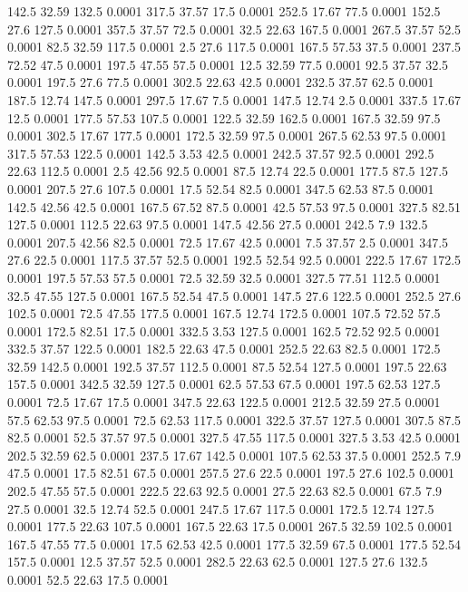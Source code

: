 142.5	32.59	132.5	0.0001
317.5	37.57	17.5	0.0001
252.5	17.67	77.5	0.0001
152.5	27.6	127.5	0.0001
357.5	37.57	72.5	0.0001
32.5	22.63	167.5	0.0001
267.5	37.57	52.5	0.0001
82.5	32.59	117.5	0.0001
2.5	27.6	117.5	0.0001
167.5	57.53	37.5	0.0001
237.5	72.52	47.5	0.0001
197.5	47.55	57.5	0.0001
12.5	32.59	77.5	0.0001
92.5	37.57	32.5	0.0001
197.5	27.6	77.5	0.0001
302.5	22.63	42.5	0.0001
232.5	37.57	62.5	0.0001
187.5	12.74	147.5	0.0001
297.5	17.67	7.5	0.0001
147.5	12.74	2.5	0.0001
337.5	17.67	12.5	0.0001
177.5	57.53	107.5	0.0001
122.5	32.59	162.5	0.0001
167.5	32.59	97.5	0.0001
302.5	17.67	177.5	0.0001
172.5	32.59	97.5	0.0001
267.5	62.53	97.5	0.0001
317.5	57.53	122.5	0.0001
142.5	3.53	42.5	0.0001
242.5	37.57	92.5	0.0001
292.5	22.63	112.5	0.0001
2.5	42.56	92.5	0.0001
87.5	12.74	22.5	0.0001
177.5	87.5	127.5	0.0001
207.5	27.6	107.5	0.0001
17.5	52.54	82.5	0.0001
347.5	62.53	87.5	0.0001
142.5	42.56	42.5	0.0001
167.5	67.52	87.5	0.0001
42.5	57.53	97.5	0.0001
327.5	82.51	127.5	0.0001
112.5	22.63	97.5	0.0001
147.5	42.56	27.5	0.0001
242.5	7.9	132.5	0.0001
207.5	42.56	82.5	0.0001
72.5	17.67	42.5	0.0001
7.5	37.57	2.5	0.0001
347.5	27.6	22.5	0.0001
117.5	37.57	52.5	0.0001
192.5	52.54	92.5	0.0001
222.5	17.67	172.5	0.0001
197.5	57.53	57.5	0.0001
72.5	32.59	32.5	0.0001
327.5	77.51	112.5	0.0001
32.5	47.55	127.5	0.0001
167.5	52.54	47.5	0.0001
147.5	27.6	122.5	0.0001
252.5	27.6	102.5	0.0001
72.5	47.55	177.5	0.0001
167.5	12.74	172.5	0.0001
107.5	72.52	57.5	0.0001
172.5	82.51	17.5	0.0001
332.5	3.53	127.5	0.0001
162.5	72.52	92.5	0.0001
332.5	37.57	122.5	0.0001
182.5	22.63	47.5	0.0001
252.5	22.63	82.5	0.0001
172.5	32.59	142.5	0.0001
192.5	37.57	112.5	0.0001
87.5	52.54	127.5	0.0001
197.5	22.63	157.5	0.0001
342.5	32.59	127.5	0.0001
62.5	57.53	67.5	0.0001
197.5	62.53	127.5	0.0001
72.5	17.67	17.5	0.0001
347.5	22.63	122.5	0.0001
212.5	32.59	27.5	0.0001
57.5	62.53	97.5	0.0001
72.5	62.53	117.5	0.0001
322.5	37.57	127.5	0.0001
307.5	87.5	82.5	0.0001
52.5	37.57	97.5	0.0001
327.5	47.55	117.5	0.0001
327.5	3.53	42.5	0.0001
202.5	32.59	62.5	0.0001
237.5	17.67	142.5	0.0001
107.5	62.53	37.5	0.0001
252.5	7.9	47.5	0.0001
17.5	82.51	67.5	0.0001
257.5	27.6	22.5	0.0001
197.5	27.6	102.5	0.0001
202.5	47.55	57.5	0.0001
222.5	22.63	92.5	0.0001
27.5	22.63	82.5	0.0001
67.5	7.9	27.5	0.0001
32.5	12.74	52.5	0.0001
247.5	17.67	117.5	0.0001
172.5	12.74	127.5	0.0001
177.5	22.63	107.5	0.0001
167.5	22.63	17.5	0.0001
267.5	32.59	102.5	0.0001
167.5	47.55	77.5	0.0001
17.5	62.53	42.5	0.0001
177.5	32.59	67.5	0.0001
177.5	52.54	157.5	0.0001
12.5	37.57	52.5	0.0001
282.5	22.63	62.5	0.0001
127.5	27.6	132.5	0.0001
52.5	22.63	17.5	0.0001
